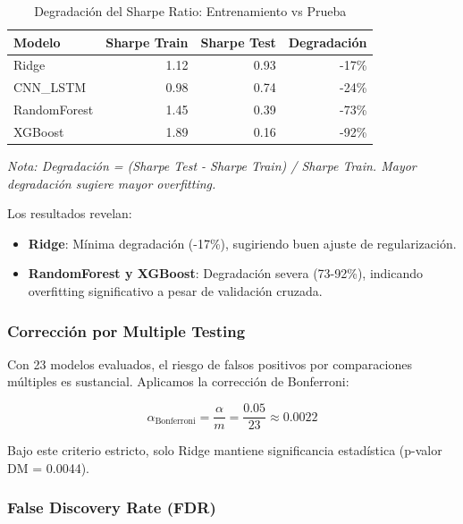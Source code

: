 \begin{table}[htbp]
\centering
\caption{Degradaci\'on del Sharpe Ratio: Entrenamiento vs Prueba}
\label{tab:in_out_sample}
\small
\begin{tabular}{@{}lrrr@{}}
\toprule
\textbf{Modelo} & \textbf{Sharpe Train} & \textbf{Sharpe Test} & \textbf{Degradaci\'on} \\
\midrule
Ridge & 1.12 & 0.93 & -17\% \\
CNN\_LSTM & 0.98 & 0.74 & -24\% \\
RandomForest & 1.45 & 0.39 & -73\% \\
XGBoost & 1.89 & 0.16 & -92\% \\
\bottomrule
\end{tabular}
\vspace{0.2cm}
\small\textit{
\small
Nota: Degradaci\'on = (Sharpe Test - Sharpe Train) / Sharpe Train. Mayor degradaci\'on sugiere mayor overfitting.}
\end{table}

Los resultados revelan:

\begin{itemize}
    \item \textbf{Ridge}: M\'inima degradaci\'on (-17\%), sugiriendo buen ajuste de regularizaci\'on.
    \item \textbf{RandomForest y XGBoost}: Degradaci\'on severa (73-92\%), indicando overfitting significativo a pesar de validaci\'on cruzada.
\end{itemize}

\subsubsection{Correcci\'on por Multiple Testing}

Con 23 modelos evaluados, el riesgo de falsos positivos por comparaciones m\'ultiples es sustancial. Aplicamos la correcci\'on de Bonferroni:

\begin{equation}
\alpha_{\text{Bonferroni}} = \frac{\alpha}{m} = \frac{0.05}{23} \approx 0.0022
\end{equation}

Bajo este criterio estricto, solo Ridge mantiene significancia estad\'istica (p-valor DM = 0.0044).

\subsubsection{False Discovery Rate (FDR)}

